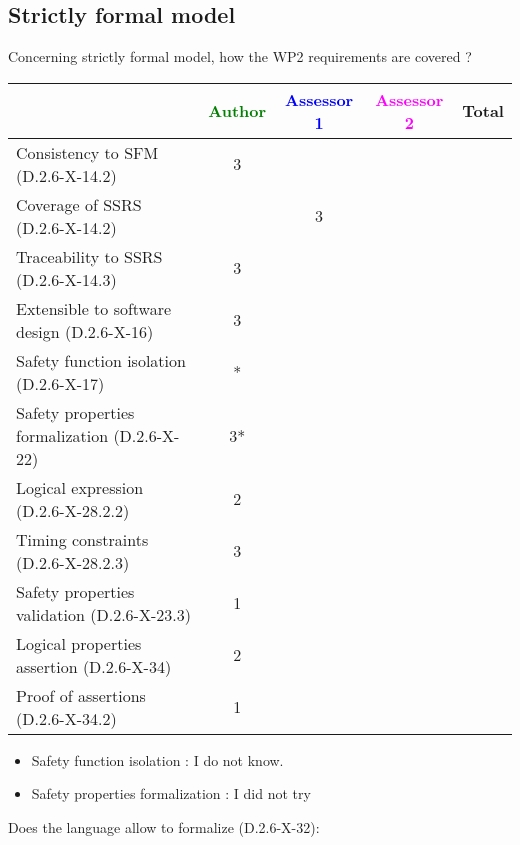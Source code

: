 \subsection{Strictly formal model}

Concerning strictly formal model, how the WP2 requirements are covered ?

\begin{tabular}{|l | c | c | c | c|}
\hline
& \textcolor{green}{Author} & \textcolor{blue}{Assessor 1} & \textcolor{magenta}{Assessor 2} & Total \\
\hline 
Consistency to SFM (D.2.6-X-14.2) &3 & & &  \\
\hline
Coverage of SSRS (D.2.6-X-14.2)  & & 3& &  \\
\hline
Traceability to  SSRS (D.2.6-X-14.3)  & 3& & &  \\
\hline
Extensible to software design (D.2.6-X-16)  &3 & & &  \\
\hline
Safety function isolation (D.2.6-X-17)  &*  & & &  \\
\hline 
Safety properties formalization (D.2.6-X-22)  &3* & & &  \\
\hline
Logical expression (D.2.6-X-28.2.2)  &2 & & &  \\
\hline
Timing constraints (D.2.6-X-28.2.3)  &3 & & &  \\
\hline
Safety properties validation (D.2.6-X-23.3)  &1 & & &  \\
\hline
Logical properties assertion (D.2.6-X-34)  &2 & & &  \\
\hline
Proof of assertions (D.2.6-X-34.2)  &1 & & &  \\
\hline
\end{tabular}

\begin{author_comment}
\begin{itemize}
\item Safety function isolation :  I do not know.
\item Safety properties formalization : I did not try
\end{itemize}

\end{author_comment}
Does the language allow to  formalize (D.2.6-X-32):

